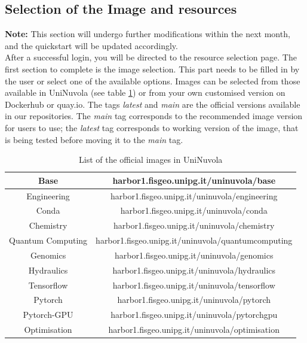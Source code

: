 \subsection{Selection of the Image and resources}

\textbf{Note:} This section will undergo further modifications within the next month, and the quickstart will be updated
accordingly. \\

After a successful login, you will be directed to the resource selection page. The first section to complete is the
image selection. This part needs to be filled in by the user or select one of the available options. Images can be
selected from those available in UniNuvola (see table \ref{tab:images}) or from your own customised version on
Dockerhub or quay.io. The tags \textit{latest} and \textit{main} are the official versions available in our repositories. The \textit{main} tag corresponds to the recommended image version for users to use; the \textit{latest} tag  corresponds to working version of the image, that is being tested before moving it to the \textit{main} tag.\\

\begin{table}[]
    \caption{List of the official images in UniNuvola}
    \label{tab:images}
    \centering
    \begin{tabular}{|c|c|}
        \hline
        Base              & harbor1.fisgeo.unipg.it/uninuvola/base             \\ \hline
        Engineering       & harbor1.fisgeo.unipg.it/uninuvola/engineering      \\ \hline
        Conda             & harbor1.fisgeo.unipg.it/uninuvola/conda            \\ \hline
        Chemistry         & harbor1.fisgeo.unipg.it/uninuvola/chemistry        \\ \hline
        Quantum Computing & harbor1.fisgeo.unipg.it/uninuvola/quantumcomputing \\ \hline
        Genomics          & harbor1.fisgeo.unipg.it/uninuvola/genomics         \\ \hline
        Hydraulics        & harbor1.fisgeo.unipg.it/uninuvola/hydraulics       \\ \hline
        Tensorflow        & harbor1.fisgeo.unipg.it/uninuvola/tensorflow       \\ \hline
        Pytorch           & harbor1.fisgeo.unipg.it/uninuvola/pytorch          \\ \hline
        Pytorch-GPU       & harbor1.fisgeo.unipg.it/uninuvola/pytorchgpu       \\ \hline
        Optimisation      & harbor1.fisgeo.unipg.it/uninuvola/optimisation     \\ \hline
    \end{tabular}
\end{table}


